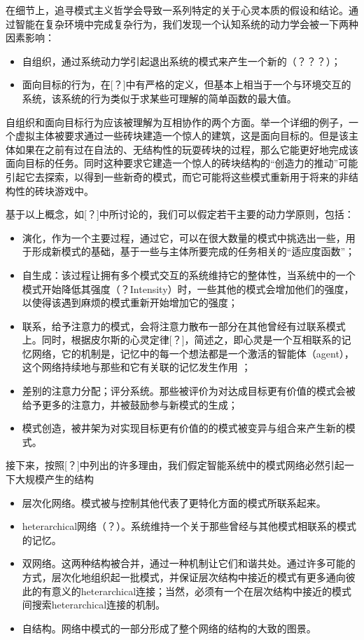 在细节上，追寻模式主义哲学会导致一系列特定的关于心灵本质的假设和结论。通过智能在复杂环境中完成复杂行为，我们发现一个认知系统的动力学会被一下两种因素影响：
\begin{itemize}
\item 自组织，通过系统动力学引起退出系统的模式来产生一个新的（？？？）；
\item 面向目标的行为，在[？]中有严格的定义，但基本上相当于一个与环境交互的系统，该系统的行为类似于求某些可理解的简单函数的最大值。
\end{itemize}

自组织和面向目标行为应该被理解为互相协作的两个方面。举一个详细的例子，一个虚拟主体被要求通过一些砖块建造一个惊人的建筑，这是面向目标的。但是该主体如果在之前有过在自法的、无结构性的玩耍砖块的过程，那么它能更好地完成该面向目标的任务。同时这种要求它建造一个惊人的砖块结构的“创造力的推动”可能引起它去探索，以得到一些新奇的模式，而它可能将这些模式重新用于将来的非结构性的砖块游戏中。

基于以上概念，如[？]中所讨论的，我们可以假定若干主要的动力学原则，包括：
\begin{itemize}
\item 演化，作为一个主要过程，通过它，可以在很大数量的模式中挑选出一些，用于形成新模式的基础，基于一些与主体所要完成的任务相关的“适应度函数”；
\item 自生成：该过程让拥有多个模式交互的系统维持它的整体性，当系统中的一个模式开始降低其强度（？Intensity）时，一些其他的模式会增加他们的强度，以使得该遇到麻烦的模式重新开始增加它的强度；
\item 联系，给予注意力的模式，会将注意力散布一部分在其他曾经有过联系模式上。同时，根据皮尔斯的心灵定律[？]，简述之，即心灵是一个互相联系的记忆网络，它的机制是，记忆中的每一个想法都是一个激活的智能体（agent），这个网络持续地与那些和它有关联的记忆发生作用 ；
\item 差别的注意力分配；评分系统。那些被评价为对达成目标更有价值的模式会被给予更多的注意力，并被鼓励参与新模式的生成；
\item 模式创造，被井架为对实现目标更有价值的的模式被变异与组合来产生新的模式。
\end{itemize}

接下来，按照[？]中列出的许多理由，我们假定智能系统中的模式网络必然引起一下大规模产生的结构
\begin{itemize}
\item 层次化网络。模式被与控制其他代表了更特化方面的模式所联系起来。
\item heterarchical网络（？）。系统维持一个关于那些曾经与其他模式相联系的模式的记忆。
\item 双网络。这两种结构被合并，通过一种机制让它们和谐共处。通过许多可能的方式，层次化地组织起一批模式，并保证层次结构中接近的模式有更多通向彼此的有意义的heterarchical连接；当然，必须有一个在层次结构中接近的模式间搜索heterarchical连接的机制。
\item 自结构。网络中模式的一部分形成了整个网络的结构的大致的图景。
\end{itemize}

